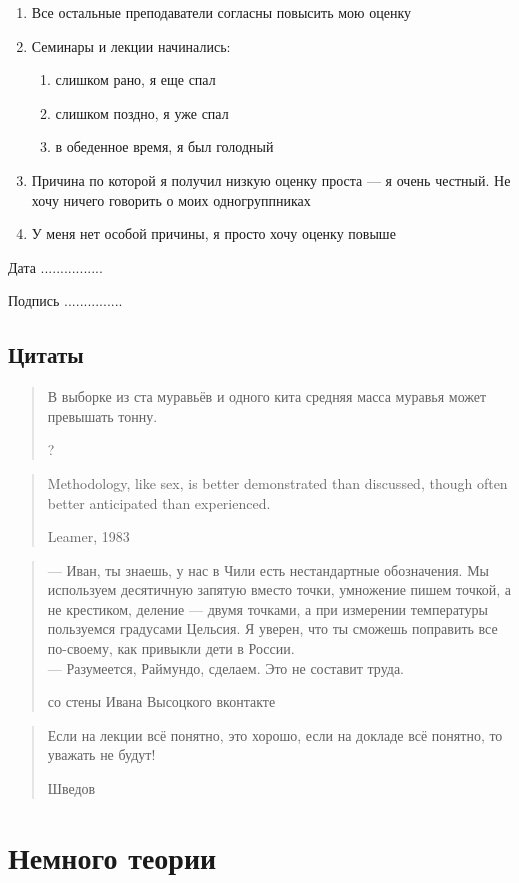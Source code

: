 \documentclass[12pt, a4paper]{article}
\begin{document}
\begin{enumerate}
\item Все остальные преподаватели согласны повысить мою оценку
\item Семинары и лекции начинались:
\begin{enumerate}
\item слишком рано, я еще спал
\item слишком поздно, я уже спал
\item в обеденное время, я был голодный
\end{enumerate}
\item Причина по которой я получил низкую оценку проста — я очень честный. Не хочу ничего говорить о моих одногруппниках
\item У меня нет особой причины, я просто хочу оценку повыше
\end{enumerate}


\vspace{10pt}
Дата ................

\vspace{10pt}
Подпись ...............

\subsection{Цитаты}

\blockquote[?]{В выборке из ста муравьёв и одного кита средняя масса муравья может превышать тонну.}

\blockquote[Leamer, 1983]{Methodology, like sex, is better demonstrated than discussed, though often better anticipated than experienced.}



\blockquote[со стены Ивана Высоцкого вконтакте]{
— Иван, ты знаешь, у нас в Чили есть нестандартные обозначения. Мы используем десятичную запятую вместо точки, умножение пишем точкой, а не крестиком, деление — двумя точками, а при измерении температуры пользуемся градусами Цельсия. Я уверен, что ты сможешь поправить все по-своему, как привыкли дети в России. \\

— Разумеется, Раймундо, сделаем. Это не составит труда.}


\blockquote[Шведов]{Если на лекции всё понятно, это хорошо, если на докладе всё понятно, то уважать не будут!}


\section{Немного теории}
\end{document}
